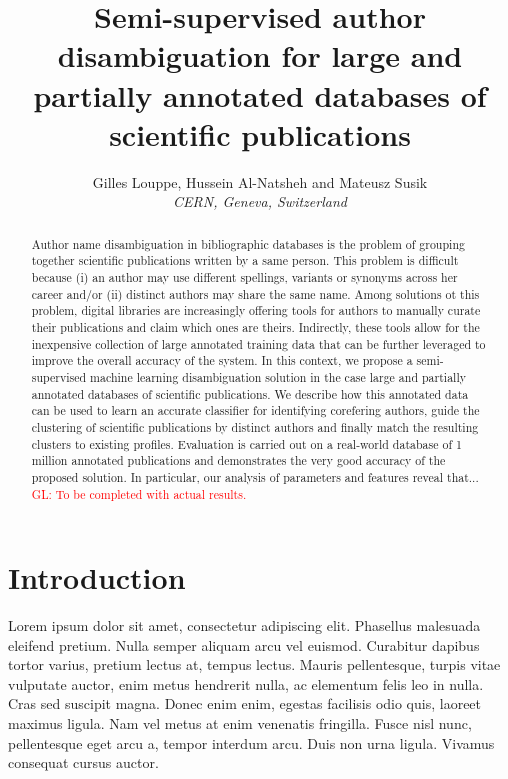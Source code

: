 \documentclass[11pt]{article}
\title{Semi-supervised author disambiguation for large and partially annotated databases of scientific publications}
\author{Gilles Louppe, Hussein Al-Natsheh and Mateusz Susik\\
       \it{CERN, Geneva, Switzerland}}
\date{}
\newcommand{\glnote}[1]{\textcolor{red}{GL: #1}}
\begin{document}
\maketitle

\begin{abstract}

Author name disambiguation in bibliographic databases is the problem of
grouping together scientific publications written by a same person. This
problem is difficult because (i) an author may use different spellings,
variants or synonyms across her career and/or (ii) distinct authors may share
the same name. Among solutions ot this problem, digital libraries are
increasingly offering tools for authors to manually curate their publications
and claim which ones are theirs. Indirectly, these tools allow for the
inexpensive collection of large annotated training data that can be further
leveraged to improve the overall accuracy of the system. In this context, we
propose a semi-supervised machine learning disambiguation solution in the case
large and partially annotated databases of scientific publications. We describe
how this annotated data can be used to learn an accurate classifier for
identifying corefering authors, guide the clustering of scientific publications
by distinct authors and finally match the resulting clusters to existing
profiles. Evaluation is carried out on a real-world database of 1 million
annotated publications and demonstrates the very good accuracy of the proposed
solution. In particular, our analysis of parameters and features reveal that...
\glnote{To be completed with actual results.}

\end{abstract}



\section{Introduction}
\label{introduction}


Lorem ipsum dolor sit amet, consectetur adipiscing elit. Phasellus malesuada
eleifend pretium. Nulla semper aliquam arcu vel euismod. Curabitur dapibus
tortor varius, pretium lectus at, tempus lectus. Mauris pellentesque, turpis
vitae vulputate auctor, enim metus hendrerit nulla, ac elementum felis leo in
nulla. Cras sed suscipit magna. Donec enim enim, egestas facilisis odio quis,
laoreet maximus ligula. Nam vel metus at enim venenatis fringilla. Fusce nisl
nunc, pellentesque eget arcu a, tempor interdum arcu. Duis non urna ligula.
Vivamus consequat cursus auctor.
\end{document}

